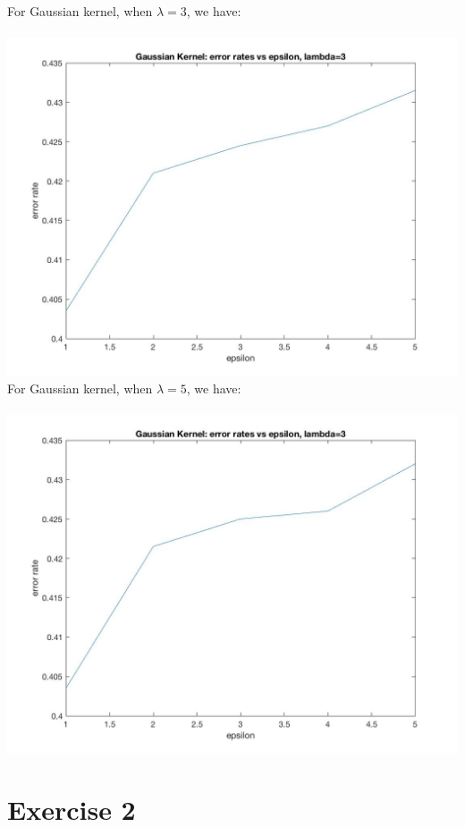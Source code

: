 \documentclass[11pt]{article} %
\begin{document}
For Gaussian kernel, when $\lambda = 3$, we have:\\\\
\includegraphics[scale = 0.4]{e14gaussianlambda3.jpg}
For Gaussian kernel, when $\lambda = 5$, we have:\\\\
\includegraphics[scale = 0.4]{e14gaussianlambda5.jpg}

\section{Exercise 2}
\end{document}
